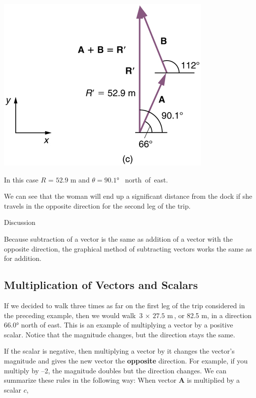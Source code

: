 \documentclass[
]{book}
\begin{document}
\includegraphics{images/Figure_03_02_17a.jpg}

In this case \(R\text{~=~52.9\ m}\) and \({\theta = \text{90.1°}}{}\)
~north~of~east.

We can see that the woman will end up a significant distance from the
dock if she travels in the opposite direction for the second leg of the
trip.

{Discussion}

Because subtraction of a vector is the same as addition of a vector with
the opposite direction, the graphical method of subtracting vectors
works the same as for addition.

\hypertarget{fs-id1165298652611}{}
\hypertarget{multiplication-of-vectors-and-scalars}{%
\subsection{Multiplication of Vectors and Scalars}\label{multiplication-of-vectors-and-scalars}}

If we decided to walk three times as far on the first leg of the trip
considered in the preceding example, then we would walk
\({{\text{3~} \times \text{~27}}\text{.}\text{5\ m}}{}\), or 82.5 m, in a
direction \({\text{66}\text{.}0\text{°}}{}\) north of east. This is an
example of multiplying a vector by a positive
\protect\hypertarget{import-auto-id1165296219603}{}{scalar}. Notice that the
magnitude changes, but the direction stays the same.

If the scalar is negative, then multiplying a vector by it changes the
vector's magnitude and gives the new vector the \textbf{opposite} direction.
For example, if you multiply by --2, the magnitude doubles but the
direction changes. We can summarize these rules in the following way:
When vector \(\mathbf{A}{}\) is multiplied by a scalar \(c{}\),
\end{document}
